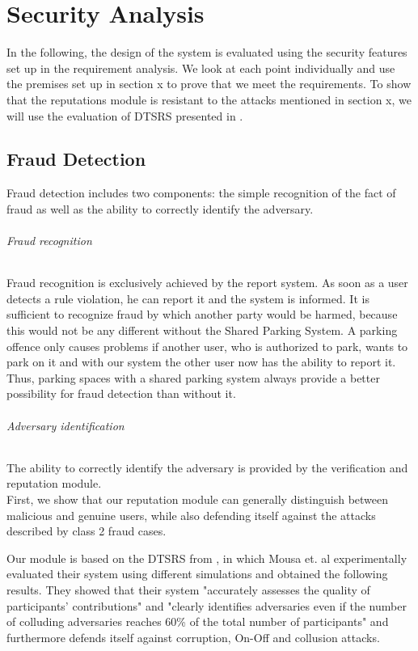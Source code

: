 \chapter{Security Analysis}
\label{ch:Security Analysis}
In the following, the design of the system is evaluated using the security features set up in the requirement analysis. We look at each point individually and use the premises set up in section x to prove that we meet the requirements. To show that the reputations module is resistant to the attacks mentioned in section x, we will use the evaluation of DTSRS presented in \cite{mousa2017reputation}.

\section{Fraud Detection}
Fraud detection includes two components: the simple recognition of the fact of fraud as well as the ability to correctly identify the adversary.  \\

\subparagraph{Fraud recognition} Fraud recognition is exclusively achieved by the report system. As soon as a user detects a rule violation, he can report it and the system is informed. It is sufficient to recognize fraud by which another party would be harmed, because this would not be any different without the Shared Parking System. A parking offence only causes problems if another user, who is authorized to park, wants to park on it and with our system the other user now has the ability to report it. Thus, parking spaces with a shared parking system always provide a better possibility for fraud detection than without it. \\

\subparagraph{Adversary identification}The ability to correctly identify the adversary is provided by the verification and reputation module. \\

First, we show that our reputation module can generally distinguish between malicious and genuine users, while also defending itself against the attacks described by class 2 fraud cases.

Our module is based on the DTSRS from \cite{mousa2017reputation}, in which Mousa et. al experimentally evaluated their system using different simulations and obtained the following results. They showed that their system "accurately assesses the quality of participants' contributions" and "clearly identifies adversaries even if the number of colluding adversaries reaches 60\% of the total number of participants" and furthermore defends itself against corruption, On-Off and collusion attacks. \\

